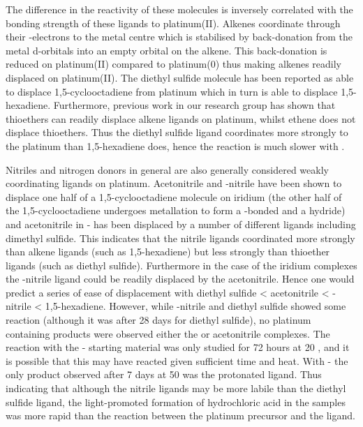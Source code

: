 The difference in the reactivity of these molecules is inversely correlated with the bonding strength of these ligands to platinum(II).  Alkenes coordinate through their -electrons to the metal centre which is stabilised by back-donation from the metal d-orbitals into an empty  orbital on the alkene.  This back-donation is reduced on platinum(II) compared to platinum(0) thus making alkenes readily displaced on platinum(II).  The diethyl sulfide molecule has been reported as able to displace 1,5-cyclooctadiene  from platinum which in turn is able to displace 1,5-hexadiene.  Furthermore, previous work in our research group has shown that thioethers can readily displace alkene ligands on platinum, whilst ethene does not displace thioethers.  Thus the diethyl sulfide ligand coordinates more strongly to the platinum than 1,5-hexadiene does, hence the reaction is much slower with \ce{[Pt(SEt2)2Cl2]}.  

Nitriles and nitrogen donors in general are also generally considered weakly coordinating ligands on platinum.  Acetonitrile and \tBu-nitrile have been shown to displace one half of a 1,5-cyclooctadiene molecule on iridium (the other half of the 1,5-cyclooctadiene undergoes metallation to form a -bonded  and a hydride)\cite{Hermann2002} and acetonitrile in \trans-\ce{[Pd(MeCN)2Cl2]} has been displaced by a number of different ligands including dimethyl sulfide.\cite{Davies1981}  This indicates that the nitrile ligands coordinated more strongly than alkene ligands (such as 1,5-hexadiene) but less strongly than thioether ligands (such as diethyl sulfide).  Furthermore in the case of the iridium complexes the \tBu-nitrile ligand could be readily displaced by the acetonitrile.\cite{Hermann2002}  Hence one would predict a series of ease of displacement with diethyl sulfide < acetonitrile < \tBu-nitrile < 1,5-hexadiene.  However, while \tBu-nitrile and diethyl sulfide showed some reaction (although it was after 28 days for diethyl sulfide), no platinum containing products were observed either the \cis{} or \trans{} acetonitrile complexes.  The reaction with the \cis-\ce{[Pt(MeCN)2Cl2]} starting material was only studied for 72 hours at 20 \degC, and it is possible that this may have reacted given sufficient time and heat.  With \trans-\ce{[Pt(MeCN)2Cl2]} the only product observed after 7 days at 50 \degC{} was the protonated ligand.  Thus indicating that although the nitrile ligands may be more labile than the diethyl sulfide ligand, the light-promoted formation of hydrochloric acid in the samples was more rapid than the reaction between the platinum precursor and the \tButhixantphos{} ligand.  

